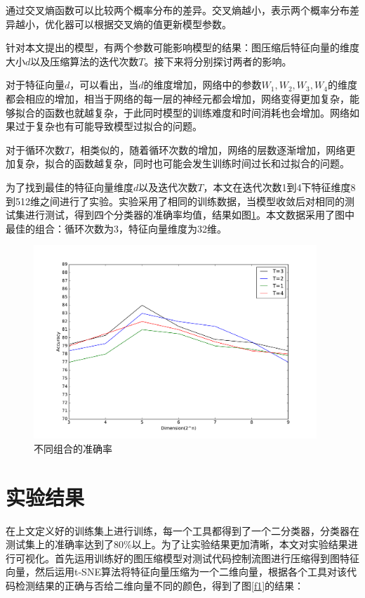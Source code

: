 通过交叉熵函数可以比较两个概率分布的差异。交叉熵越小，表示两个概率分布差异越小，优化器可以根据交叉熵的值更新模型参数。

针对本文提出的模型，有两个参数可能影响模型的结果：图压缩后特征向量的维度大小$d$以及压缩算法的迭代次数$T$。接下来将分别探讨两者的影响。


对于特征向量$d$，可以看出，当$d$的维度增加，网络中的参数$W_1, W_2, W_3, W_4$的维度都会相应的增加，相当于网络的每一层的神经元都会增加，网络变得更加复杂，能够拟合的函数也就越复杂，于此同时模型的训练难度和时间消耗也会增加。网络如果过于复杂也有可能导致模型过拟合的问题。

对于循环次数$T$，相类似的，随着循环次数的增加，网络的层数逐渐增加，网络更加复杂，拟合的函数越复杂，同时也可能会发生训练时间过长和过拟合的问题。

为了找到最佳的特征向量维度$d$以及迭代次数$T$，本文在迭代次数1到4下特征维度8到512维之间进行了实验。实验采用了相同的训练数据，当模型收敛后对相同的测试集进行测试，得到四个分类器的准确率均值，结果如图\ref{mid}。本文数据采用了图中最佳的组合：循环次数为3，特征向量维度为32维。
\begin{figure}[htbp]
	\begin{center}
		\includegraphics[width=0.95\textwidth]{figures//9.pdf}
		\caption{不同组合的准确率}
		\label{mid}
	\end{center}
\end{figure}
\section{实验结果}
在上文定义好的训练集上进行训练，每一个工具都得到了一个二分类器，分类器在测试集上的准确率达到了80\%以上。为了让实验结果更加清晰，本文对实验结果进行可视化。首先运用训练好的图压缩模型对测试代码控制流图进行压缩得到图特征向量，然后运用t-SNE算法将特征向量压缩为一个二维向量，根据各个工具对该代码检测结果的正确与否给二维向量不同的颜色，得到了图\ref{f1}的结果：

